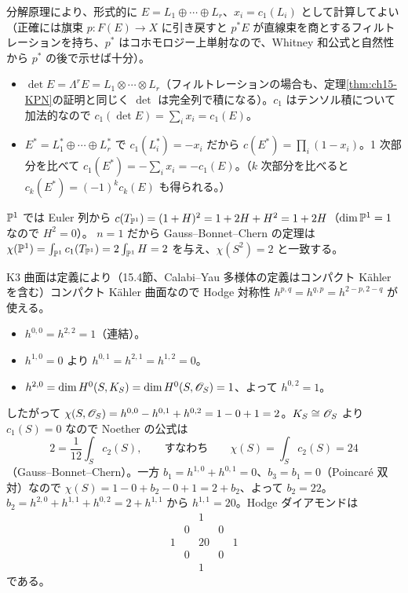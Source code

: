 分解原理により、形式的に $E = L_1\oplus\cdots\oplus L_r$、$x_i = c_1(L_i)$ として計算してよい（正確には旗束 $p:F(E)\to X$ に引き戻すと $p^*E$ が直線束を商とするフィルトレーションを持ち、$p^*$ はコホモロジー上単射なので、Whitney 和公式と自然性から $p^*$ の後で示せば十分）。
\begin{itemize}
\item $\det E = \Lambda^rE = L_1\otimes\cdots\otimes L_r$（フィルトレーションの場合も、定理\ref{thm:ch15-KPN}の証明と同じく $\det$ は完全列で積になる）。$c_1$ はテンソル積について加法的なので
$c_1(\det E) = \sum_ix_i = c_1(E)$。
\item $E^* = L_1^*\oplus\cdots\oplus L_r^*$ で $c_1(L_i^*) = -x_i$ だから
$c(E^*) = \prod_i(1-x_i)$。1 次部分を比べて $c_1(E^*) = -\sum_ix_i = -c_1(E)$。（$k$ 次部分を比べると $c_k(E^*) = (-1)^kc_k(E)$ も得られる。）
\end{itemize}
$\mathbb{P}^1$ では Euler 列から $c(T_{\mathbb{P}^1}) = (1+H)^2 = 1+2H+H^2 = 1+2H$（$\dim\mathbb{P}^1 = 1$ なので $H^2 = 0$）。
$n = 1$ だから Gauss--Bonnet--Chern の定理は $\chi(\mathbb{P}^1) = \int_{\mathbb{P}^1}c_1(T_{\mathbb{P}^1}) = 2\int_{\mathbb{P}^1}H = 2$ を与え、$\chi(S^2) = 2$ と一致する。

K3 曲面は定義により（15.4節、Calabi--Yau 多様体の定義はコンパクト K\"ahler を含む）コンパクト K\"ahler 曲面なので Hodge 対称性 $h^{p,q} = h^{q,p} = h^{2-p,2-q}$ が使える。
\begin{itemize}
\item $h^{0,0} = h^{2,2} = 1$（連結）。
\item $h^{1,0} = 0$ より $h^{0,1} = h^{2,1} = h^{1,2} = 0$。
\item $h^{2,0} = \dim H^0(S,K_S) = \dim H^0(S,\mathscr{O}_S) = 1$、よって $h^{0,2} = 1$。
\end{itemize}
したがって $\chi(S,\mathscr{O}_S) = h^{0,0} - h^{0,1} + h^{0,2} = 1 - 0 + 1 = 2$。$K_S\cong\mathscr{O}_S$ より $c_1(S) = 0$ なので Noether の公式は
\[
2 = \frac1{12}\int_S c_2(S),\qquad\text{すなわち}\qquad \chi(S) = \int_Sc_2(S) = 24
\]
（Gauss--Bonnet--Chern）。一方 $b_1 = h^{1,0}+h^{0,1} = 0$、$b_3 = b_1 = 0$（Poincar\'e 双対）なので $\chi(S) = 1 - 0 + b_2 - 0 + 1 = 2 + b_2$、よって $b_2 = 22$。
$b_2 = h^{2,0}+h^{1,1}+h^{0,2} = 2 + h^{1,1}$ から $h^{1,1} = 20$。Hodge ダイアモンドは
\[
\begin{array}{ccccc}
 & & 1 & & \\
 & 0 & & 0 & \\
1 & & 20 & & 1\\
 & 0 & & 0 & \\
 & & 1 & &
\end{array}
\]
である。

